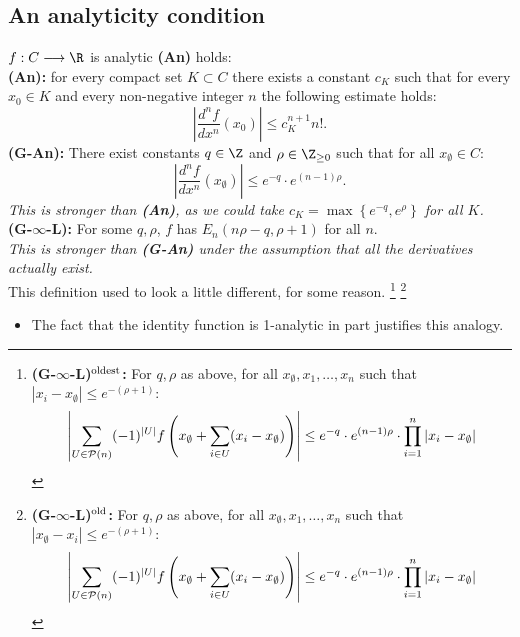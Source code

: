 \documentclass[11pt]{article}
\begin{document}
\begin{Calculus II}
\pagebreak

\subsection*{An analyticity condition}
$f:C\to\R$ is analytic \Iff \textbf{(An)} holds:\\
\textbf{(An):} 
for every compact set $K\subset C$ there exists a constant $c_K$ such that for every $x_0\in K$ and every non-negative integer $n$ the following estimate holds:
\[\left|\frac{d^nf }{dx^n}(x_0)\right|\leq c_K^{n+1}n!.\]
\textbf{(G-An):} There exist constants $q\in\Z$ and $\rho\in\Z_{\geq0}$ such that for all $x_\emptyset\in C$:
\[\left|\frac{d^nf }{dx^n}(x_\emptyset)\right|
\leq e^{-q}\cdot e^{(n-1)\rho}
.\]
\emph{This is stronger than \textbf{\textup{(An)}}, as we could take $c_K=\max\left\{e^{-q},e^\rho\right\}$ for all $K$.}\\
\textbf{(G-$\infty$-L):}
For some $q,\rho$, $f$ has $E_n(n\rho-q,\rho+1)$ for all $n$.\\
\emph{This is stronger than \textbf{\textup{(G-An)}} under the assumption that all the derivatives actually exist.}\\
This definition used to look a little different, for some reason.%
\footnote{\textbf{(G-$\infty$-L)$^\textup{oldest}$:}
For $q,\rho$ as above, for all $x_\emptyset,x_1,\ldots,x_n$ such that $|x_i-x_\emptyset|\leq e^{-{(\rho+1)}}$:
\[\left|\sum_{U\in \mathcal{P}(n)}(-1)^{|U|}f\left(x_\emptyset+\sum_{i\in U}(x_i-x_\emptyset)\right)\right|
\leq e^{-q}\cdot e^{(n-1)\rho}
\cdot\prod_{i=1}^n|x_i-x_\emptyset|\]
}%
\footnote{\textbf{(G-$\infty$-L)$^\textup{old}$:} For $q,\rho$ as above, for all $x_\emptyset,x_1,\ldots,x_n$ such that $|x_\emptyset-x_i|\leq e^{-{(\rho+1)}}$:
\[\left|\sum_{U\in \mathcal{P}(n)}(-1)^{|U|}f\left(x_\emptyset+\sum_{i\in U}(x_i-x_\emptyset)\right)\right|
\leq e^{-q}\cdot e^{(n-1)\rho}
\cdot\prod_{i=1}^n \left| x_i-x_\emptyset\right|\]}

\begin{itemize}\squishlist
\setlength{\parindent}{.25in}
\item The fact that the identity function is 1-analytic in part justifies this analogy.
\end{itemize}

\pagebreak


\end{Calculus II}
\end{document}
